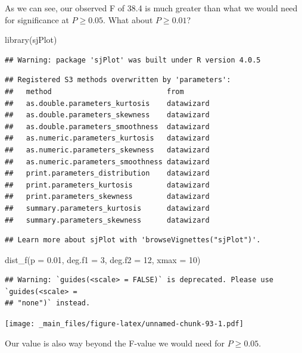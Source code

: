 \documentclass[
]{book}
\newenvironment{Shaded}{\begin{snugshade}}{\end{snugshade}}
\newcommand{\AttributeTok}[1]{\textcolor[rgb]{0.77,0.63,0.00}{#1}}
\newcommand{\DecValTok}[1]{\textcolor[rgb]{0.00,0.00,0.81}{#1}}
\newcommand{\FloatTok}[1]{\textcolor[rgb]{0.00,0.00,0.81}{#1}}
\newcommand{\FunctionTok}[1]{\textcolor[rgb]{0.00,0.00,0.00}{#1}}
\newcommand{\NormalTok}[1]{#1}
\begin{document}
As we can see, our observed F of 38.4 is much greater than what we would need for significance at \(P\ge0.05\). What about \(P\ge0.01\)?

\begin{Shaded}
\begin{Highlighting}[]
\FunctionTok{library}\NormalTok{(sjPlot)}
\end{Highlighting}
\end{Shaded}

\begin{verbatim}
## Warning: package 'sjPlot' was built under R version 4.0.5
\end{verbatim}

\begin{verbatim}
## Registered S3 methods overwritten by 'parameters':
##   method                           from      
##   as.double.parameters_kurtosis    datawizard
##   as.double.parameters_skewness    datawizard
##   as.double.parameters_smoothness  datawizard
##   as.numeric.parameters_kurtosis   datawizard
##   as.numeric.parameters_skewness   datawizard
##   as.numeric.parameters_smoothness datawizard
##   print.parameters_distribution    datawizard
##   print.parameters_kurtosis        datawizard
##   print.parameters_skewness        datawizard
##   summary.parameters_kurtosis      datawizard
##   summary.parameters_skewness      datawizard
\end{verbatim}

\begin{verbatim}
## Learn more about sjPlot with 'browseVignettes("sjPlot")'.
\end{verbatim}

\begin{Shaded}
\begin{Highlighting}[]
\FunctionTok{dist\_f}\NormalTok{(}\AttributeTok{p =} \FloatTok{0.01}\NormalTok{, }\AttributeTok{deg.f1 =} \DecValTok{3}\NormalTok{, }\AttributeTok{deg.f2 =} \DecValTok{12}\NormalTok{, }\AttributeTok{xmax =} \DecValTok{10}\NormalTok{)}
\end{Highlighting}
\end{Shaded}

\begin{verbatim}
## Warning: `guides(<scale> = FALSE)` is deprecated. Please use `guides(<scale> =
## "none")` instead.
\end{verbatim}

\texttt{[image: \_main\_files/figure-latex/unnamed-chunk-93-1.pdf]}

Our value is also way beyond the F-value we would need for \(P\ge0.05\).
\end{document}
